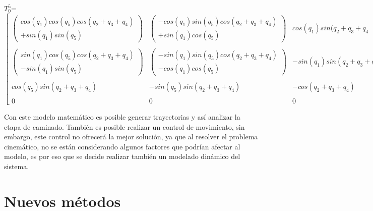\begin{center}
{\footnotesize
\begin{center}
				$T_0^5 $= 	
	\begin{math}
\left[
		\begin{array}{ccc}
		\left(\begin{array}{c}
		 cos(q_1)cos(q_5)cos(q_2+q_3+q_4)\\
			   +sin(q_1)sin(q_5)
			   \end{array}\right)&\left(\begin{array}{c}
			   -cos(q_1)sin(q_5)cos(q_2+q_3+q_4)\\
			   +sin(q_1)cos(q_5)
			   \end{array}\right)&cos(q_1)sin(q_2+q_3+q_4\\
			   && \\
\left(\begin{array}{c}
sin(q_1)cos(q_5)cos(q_2+q_3+q_4)\\
-sin(q_1)sin(q_5) \end{array}\right)&\left(\begin{array}{c}
-sin(q_1)sin(q_5)cos(q_2+q_3+q_4)\\
-cos(q_1)cos(q_5)\end{array}\right)&-sin(q_1)sin(q_2+q_3+q_4)\\
   && \\
cos(q_5)sin(q_2+q_3+q_4)&-sin(q_5)sin(q_2+q_3+q_4)&-cos(q_2+q_3+q_4)\\
 & & \\
0&0&0
		\end{array}
				\right]
				\end{math}\\
\end{center}
}
\end{center}

Con este modelo matemático es posible generar trayectorias y así analizar la etapa de caminado. También es posible realizar un control de movimiento, sin embargo, este control no ofrecerá la mejor solución, ya que al resolver el problema cinemático, no se están considerando algunos factores que podrían afectar al modelo, es por eso que se decide realizar también un modelado dinámico del sistema.

\section{Nuevos métodos}


